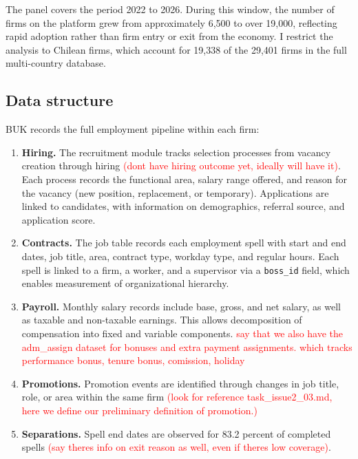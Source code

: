 \documentclass[11pt]{article}
\begin{document}
The panel covers the period 2022 to 2026. During this window, the number of firms on the platform grew from approximately 6,500 to over 19,000, reflecting rapid adoption rather than firm entry or exit from the economy. I restrict the analysis to Chilean firms, which account for 19,338 of the 29,401 firms in the full multi-country database.

\subsection{Data structure}

BUK records the full employment pipeline within each firm:

\begin{enumerate}
\item \textbf{Hiring.} The recruitment module tracks selection processes from vacancy creation through hiring \textcolor{red}{(dont have hiring outcome yet, ideally will have it)}. Each process records the functional area, salary range offered, and reason for the vacancy (new position, replacement, or temporary). Applications are linked to candidates, with information on demographics, referral source, and application score.

\item \textbf{Contracts.} The job table records each employment spell with start and end dates, job title, area, contract type, workday type, and regular hours. Each spell is linked to a firm, a worker, and a supervisor via a \texttt{boss\_id} field, which enables measurement of organizational hierarchy.

\item \textbf{Payroll.} Monthly salary records include base, gross, and net salary, as well as taxable and non-taxable earnings. This allows decomposition of compensation into fixed and variable components. \textcolor{red}{say that we also have the adm\_assign dataset for bonuses and extra payment assignments. which tracks performance bonus, tenure bonus, comission, holiday}

\item \textbf{Promotions.} Promotion events are identified through changes in job title, role, or area within the same firm \textcolor{red}{(look for reference task\_issue2\_03.md, here we define our preliminary definition of promotion.)}%

\item \textbf{Separations.} Spell end dates are observed for 83.2 percent of completed spells \textcolor{red}{(say theres info on exit reason as well, even if theres low coverage)}. %
\end{enumerate}
\end{document}
